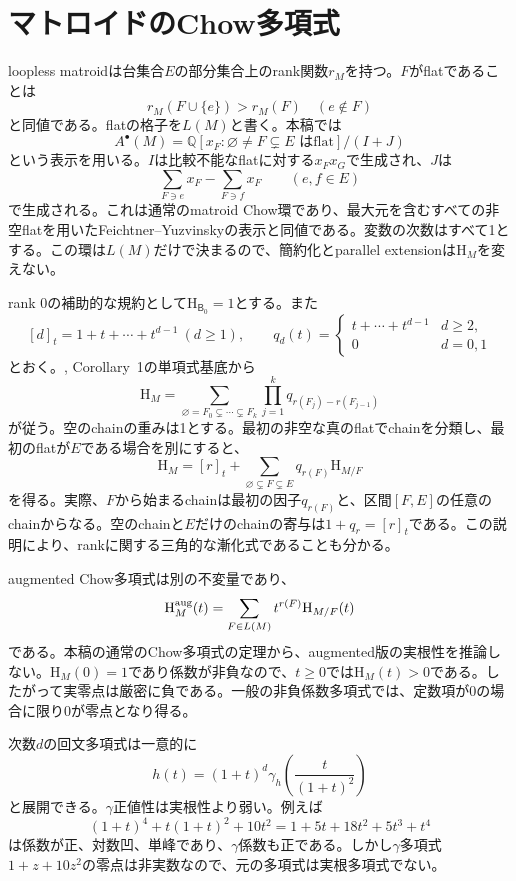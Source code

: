 \documentclass[12pt]{amsart}
\theoremstyle{definition}
\theoremstyle{remark}
\numberwithin{equation}{section}
\newcommand{\Q}{\mathbb{Q}}
\newcommand{\HCh}{\mathrm{H}}
\newcommand{\Bmat}{\mathsf{B}}
\begin{document}
\section{マトロイドのChow多項式}
loopless matroidは台集合$E$の部分集合上のrank関数$r_M$を持つ。$F$がflatであることは
\[
 r_M(F\cup\{e\})>r_M(F)\quad(e\notin F)
\]
と同値である。flatの格子を$L(M)$と書く。本稿では
\[
 A^\bullet(M)=\Q[x_F:\varnothing\ne F\subsetneq E\text{ はflat}]/(I+J)
\]
という表示を用いる。$I$は比較不能なflatに対する$x_Fx_G$で生成され、$J$は
\[
 \sum_{F\ni e}x_F-\sum_{F\ni f}x_F\qquad(e,f\in E)
\]
で生成される。これは通常のmatroid Chow環であり、最大元を含むすべての非空flatを用いたFeichtner--Yuzvinskyの表示と同値である。変数の次数はすべて1とする。この環は$L(M)$だけで決まるので、簡約化とparallel extensionは$\HCh_M$を変えない。

rank 0の補助的な規約として$\HCh_{\Bmat_0}=1$とする。また
\[
 [d]_t=1+t+\cdots+t^{d-1}\ (d\geq1),\qquad
 q_d(t)=\begin{cases}t+\cdots+t^{d-1}&d\geq2,\\0&d=0,1\end{cases}
\]
とおく。\cite{FY04}, Corollary~1の単項式基底から
\begin{equation}\label{ja-chain}
 \HCh_M=\sum_{\varnothing=F_0\subsetneq\cdots\subsetneq F_k}
          \prod_{j=1}^k q_{r(F_j)-r(F_{j-1})}
\end{equation}
が従う。空のchainの重みは1とする。最初の非空な真のflatでchainを分類し、最初のflatが$E$である場合を別にすると、
\begin{equation}\label{ja-positive}
 \HCh_M=[r]_t+
 \sum_{\varnothing\subsetneq F\subsetneq E}q_{r(F)}\HCh_{M/F}
\end{equation}
を得る。実際、$F$から始まるchainは最初の因子$q_{r(F)}$と、区間$[F,E]$の任意のchainからなる。空のchainと$E$だけのchainの寄与は$1+q_r=[r]_t$である。この説明により、rankに関する三角的な漸化式であることも分かる。

augmented Chow多項式は別の不変量であり、
\[
 \HCh_M^{\rm aug}(t)=\sum_{F\in L(M)}t^{r(F)}\HCh_{M/F}(t)
\]
である。本稿の通常のChow多項式の定理から、augmented版の実根性を推論しない。$\HCh_M(0)=1$であり係数が非負なので、$t\geq0$では$\HCh_M(t)>0$である。したがって実零点は厳密に負である。一般の非負係数多項式では、定数項が0の場合に限り0が零点となり得る。

次数$d$の回文多項式は一意的に
\[
 h(t)=(1+t)^d\gamma_h\!\left(\frac{t}{(1+t)^2}\right)
\]
と展開できる。$\gamma$正値性は実根性より弱い。例えば
\[
 (1+t)^4+t(1+t)^2+10t^2=1+5t+18t^2+5t^3+t^4
\]
は係数が正、対数凹、単峰であり、$\gamma$係数も正である。しかし$\gamma$多項式$1+z+10z^2$の零点は非実数なので、元の多項式は実根多項式でない。
\end{document}

